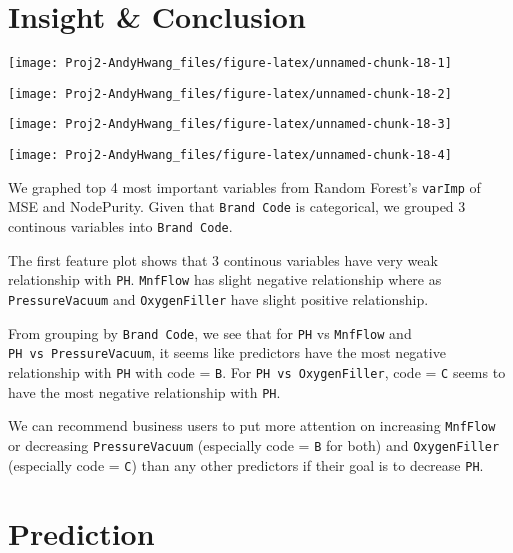 \documentclass[]{report}
\begin{document}
\section{Insight \& Conclusion}\label{insight-conclusion}

\begin{center}\texttt{[image: Proj2-AndyHwang\_files/figure-latex/unnamed-chunk-18-1]} \end{center}

\begin{center}\texttt{[image: Proj2-AndyHwang\_files/figure-latex/unnamed-chunk-18-2]} \end{center}

\begin{center}\texttt{[image: Proj2-AndyHwang\_files/figure-latex/unnamed-chunk-18-3]} \end{center}

\begin{center}\texttt{[image: Proj2-AndyHwang\_files/figure-latex/unnamed-chunk-18-4]} \end{center}

We graphed top 4 most important variables from Random Forest's
\texttt{varImp} of MSE and NodePurity. Given that \texttt{Brand\ Code}
is categorical, we grouped 3 continous variables into
\texttt{Brand\ Code}.

The first feature plot shows that 3 continous variables have very weak
relationship with \texttt{PH}. \texttt{MnfFlow} has slight negative
relationship where as \texttt{PressureVacuum} and \texttt{OxygenFiller}
have slight positive relationship.

From grouping by \texttt{Brand\ Code}, we see that for \texttt{PH} vs
\texttt{MnfFlow} and \texttt{PH\ vs\ PressureVacuum}, it seems like
predictors have the most negative relationship with \texttt{PH} with
code = \texttt{B}. For \texttt{PH\ vs\ OxygenFiller}, code = \texttt{C}
seems to have the most negative relationship with \texttt{PH}.

We can recommend business users to put more attention on increasing
\texttt{MnfFlow} or decreasing \texttt{PressureVacuum} (especially code
= \texttt{B} for both) and \texttt{OxygenFiller} (especially code =
\texttt{C}) than any other predictors if their goal is to decrease
\texttt{PH}.

\section{Prediction}\label{prediction}
\end{document}
